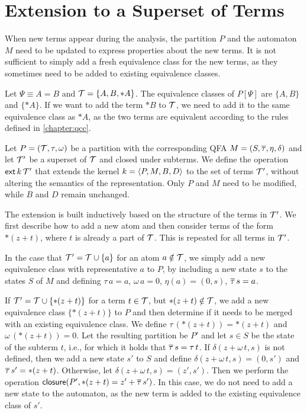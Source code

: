 \section{Extension to a Superset of Terms}

When new terms appear during the analysis, the partition $P$ and the automaton $M$ need to be updated to express properties about the new terms.
It is not sufficient to simply add a fresh equivalence class for the new terms, as they sometimes need to be added to existing equivalence classes.

\begin{example}
    Let $\Psi \equiv A = B$ and $\T = \{A, B, *A\}$.
    The equivalence classes of $P[\Psi]$ are $\{A, B\}$ and $\{*A\}$.
    If we want to add the term $*B$ to $\T$, we need to add it to the same equivalence class as $*A$, as the two terms are equivalent according to the rules defined in \cref{chapter:qcc}.
\end{example}

Let $P = (\T, \tau, \omega)$ be a partition with the corresponding QFA $M = (S, \otau, \eta, \delta)$ and let $\T'$ be a superset of $\T$ and closed under subterms.
We define the operation $\ext{k}{\T'}$ that extends the kernel $k = \angl{P, M, B, D}$ to the set of terms $\T'$, without altering the semantics of the representation.
Only $P$ and $M$ need to be modified, while $B$ and $D$ remain unchanged.

The extension is built inductively based on the structure of the terms in $\T'$.
We first describe how to add a new atom and then consider terms of the form $*(z+t)$, where $t$ is already a part of $\T$.
This is repeated for all terms in $\T'$.

In the case that $\T' = \T \cup \{a\}$ for an atom $a \notin \T$, we simply add a new equivalence class with representative $a$ to $P$, by including a new state $s$ to the states $S$ of $M$ and defining $\tau\,a = a$, $\omega\,a=0$, $\eta(a) = (0,s)$, $\otau\,s = a$.

If $\T' = \T \cup \{*(z+t)\}$ for a term $t \in \T$, but $*(z + t) \notin \T$, we add a new equivalence class $\{*(z+t)\}$ to $P$ and then determine if it needs to be merged with an existing equivalence class.
We define $\tau\,(*(z+t)) = *(z+t)$ and $\omega\,(*(z+t))=0$.
Let the resulting partition be $P'$ and let $s \in S$ be the state of the subterm $t$, i.e., for which it holds that $\otau\,s = \tau\,t$.
If $\delta(z + \omega\,t,s)$ is not defined, then we add a new state $s'$ to $S$ and define $\delta(z + \omega\,t, s) = (0, s')$ and $\otau\,s' = *(z+t)$.
Otherwise, let $\delta(z + \omega\,t, s) = (z', s')$.
Then we perform the operation $\closure{*(z + t)}{z'}{\otau\,s'}{P'}$.
In this case, we do not need to add a new state to the automaton,
as the new term is added to the existing equivalence class of $s'$.
